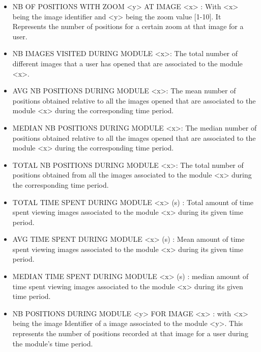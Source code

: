 \documentclass[a4paper,11pt]{report}
\numberwithin{figure}{section} %
\begin{document}
\begin{itemize}
    \item[\textbullet] NB OF POSITIONS WITH ZOOM <y> AT IMAGE <x> : With <x> being the image identifier and <y> being the zoom value [1-10].
    It Represents the number of positions for a certain zoom  at that image for a user. \\

    \item[\textbullet] NB IMAGES VISITED DURING MODULE <x>: The total number of different images that a user has opened that are associated to the module <x>.\\
    
    \item[\textbullet] AVG NB POSITIONS DURING MODULE <x>: The mean number of positions obtained relative to all the images opened that are associated to the module <x> during the corresponding time period.\\
    
    \item[\textbullet] MEDIAN NB POSITIONS DURING MODULE <x>: The median number of positions obtained relative to all the images opened that are associated to the module <x> during the corresponding time period.\\
    
    \item[\textbullet] TOTAL NB POSITIONS DURING MODULE <x>: The total number of positions obtained from all the images associated to the module <x> during the corresponding time period.\\
    
    \item[\textbullet] TOTAL TIME SPENT DURING MODULE <x> (s) : Total amount of time spent viewing images associated to the module <x> during its given time period.\\    
    
    \item[\textbullet] AVG TIME SPENT DURING MODULE <x> (s) : Mean amount of time spent viewing images associated to the module <x> during its given time period.\\    
    
    \item[\textbullet] MEDIAN TIME SPENT DURING MODULE <x> (s) : median amount of time spent viewing images associated to the module <x> during its given time period.\\
    
    \item[\textbullet] NB POSITIONS DURING MODULE <y> FOR IMAGE <x> : with <x> being the image Identifier of a image associated to the module <y>.
    This represents the number of positions recorded at that image for a user during the module's time period. \\
       

\end{itemize}
\end{document}
